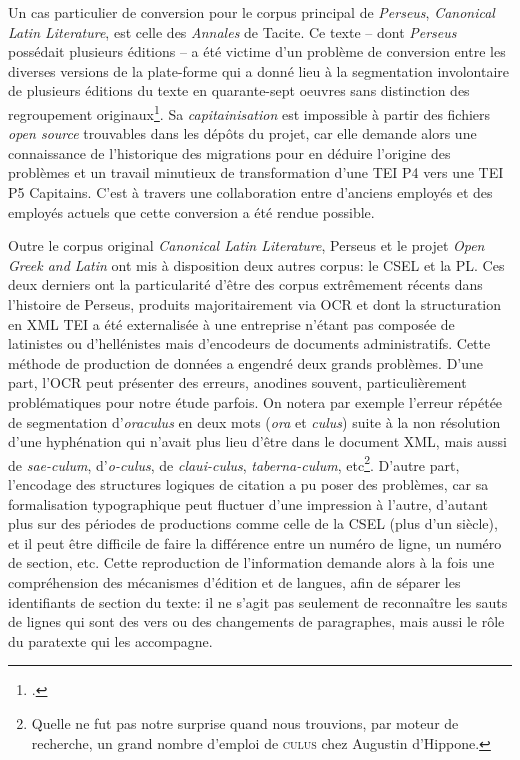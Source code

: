 Un cas particulier de conversion pour le corpus principal de \textit{Perseus}, \textit{Canonical Latin Literature}, est celle des \textit{Annales} de Tacite. Ce texte -- dont \textit{Perseus} possédait plusieurs éditions -- a été victime d'un problème de conversion entre les diverses versions de la plate-forme qui a donné lieu à la segmentation involontaire de plusieurs éditions du texte en quarante-sept oeuvres sans distinction des regroupement originaux\footcite{noauthor_canonical_latinlitphi0660phi003perseus_lat2xml_nodate, clerice_phi0914phi001lat2_nodate}. Sa \textit{capitainisation} est impossible à partir des fichiers \textit{open source} trouvables dans les dépôts du projet, car elle demande alors une connaissance de l'historique des migrations pour en déduire l'origine des problèmes et un travail minutieux de transformation d'une TEI P4 vers une TEI P5 Capitains. C'est à travers une collaboration entre d'anciens employés et des employés actuels que cette conversion a été rendue possible.

Outre le corpus original \textit{Canonical Latin Literature}, Perseus et le projet \textit{Open Greek and Latin} ont mis à disposition deux autres corpus: le CSEL et la PL. Ces deux derniers ont la particularité d'être des corpus extrêmement récents dans l'histoire de Perseus, produits majoritairement via OCR et dont la structuration en XML TEI a été externalisée à une entreprise n'étant pas composée de latinistes ou d'hellénistes mais d'encodeurs de documents administratifs. Cette méthode de production de données a engendré deux grands problèmes. D'une part, l'OCR peut présenter des erreurs, anodines souvent, particulièrement problématiques pour notre étude parfois. On notera par exemple l'erreur répétée de segmentation d'\textit{oraculus} en deux mots (\textit{ora} et \textit{culus}) suite à la non résolution d'une hyphénation qui n'avait plus lieu d'être dans le document XML, mais aussi de \textit{sae-culum}, d'\textit{o-culus}, de \textit{claui-culus}, \textit{taberna-culum}, etc\footnote{Quelle ne fut pas notre surprise quand nous trouvions, par moteur de recherche, un grand nombre d'emploi de \textsc{culus} chez Augustin d'Hippone.}. D'autre part, l'encodage des structures logiques de citation a pu poser des problèmes, car sa formalisation typographique peut fluctuer d'une impression à l'autre, d'autant plus sur des périodes de productions comme celle de la CSEL (plus d'un siècle), et il peut être difficile de faire la différence entre un numéro de ligne, un numéro de section, etc. Cette reproduction de l'information demande alors à la fois une compréhension des mécanismes d'édition et de langues, afin de séparer les identifiants de section du texte: il ne s'agit pas seulement de reconnaître les sauts de lignes qui sont des vers ou des changements de paragraphes, mais aussi le rôle du paratexte qui les accompagne.

